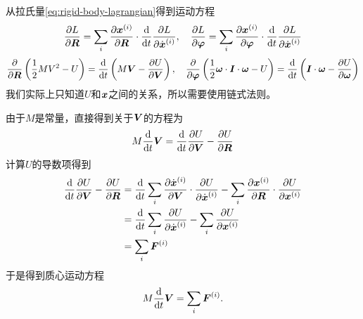 \documentclass[UTF8, a4paper]{ctexart}
\begin{document}
从拉氏量\eqref{eq:rigid-body-lagrangian}得到运动方程
\[
    \pdv{L}{\vb*{R}} = \sum_i \pdv{\vb*{x}^{(i)}}{\vb*{R}} \cdot \dv{t} \pdv{L}{\dot{\vb*{x}}^{(i)}}, \quad \pdv{L}{\vb*{\varphi}} = \sum_i \pdv{\vb*{x}^{(i)}}{\vb*{\varphi}} \cdot \dv{t} \pdv{L}{\dot{\vb*{x}}^{(i)}}
\]
\[
    \pdv{\vb*{R}} \left( \frac{1}{2} M V^2 - U \right) = \dv{t} \left(M \vb*{V} - \pdv{U}{\vb*{V}}\right), \quad \pdv{\vb*{\varphi}} \left( \frac{1}{2} \vb*{\omega} \cdot \vb*{I} \cdot \vb*{\omega} - U \right) = \dv{t} \left( \vb*{I} \cdot \vb*{\omega} - \pdv{U}{\vb*{\omega}} \right)
\]
我们实际上只知道$U$和$\vb*{x}$之间的关系，所以需要使用链式法则。

由于$M$是常量，直接得到关于$\vb*{V}$的方程为
\[
    M \dv{t} \vb*{V} = \dv{t} \pdv{U}{\vb*{V}} - \pdv{U}{\vb*{R}}
\]
计算$U$的导数项得到
\[
    \begin{aligned}
        \dv{t} \pdv{U}{\vb*{V}} - \pdv{U}{\vb*{R}} &=
        \dv{t} \sum_i \pdv{\dot{\vb*{x}}^{(i)}}{\vb*{V}} \cdot \pdv{U}{\dot{\vb*{x}}^{(i)}} 
        - \sum_i \pdv{\vb*{x}^{(i)}}{\vb*{R}} \cdot \pdv{U}{\vb*{x}^{(i)}}  \\
        &= \dv{t} \sum_i \pdv{U}{\dot{\vb*{x}}^{(i)}} - \sum_i \pdv{U}{\vb*{x}^{(i)}} \\
        &= \sum_i \vb*{F}^{(i)}
    \end{aligned}
\]
于是得到质心运动方程
\begin{equation}
    M \dv{t} \vb*{V} = \sum_i \vb*{F}^{(i)}.
    \label{eq:mass-center-motion}
\end{equation}
\end{document}
